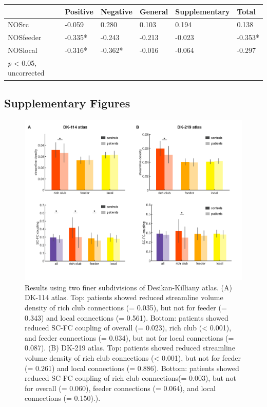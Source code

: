 \begin{refsection}
\bigskip

\scriptsize
\centering
{}
\label{tableS2:Corr} 
\begin{tabular}{llllll}\toprule
 &Positive&Negative&General&Supplementary&Total\\
 \midrule
NOSrc&-0.059&0.280&0.103&0.194&0.138\\
NOSfeeder&-0.335*&-0.243&-0.213&-0.023&-0.353*\\
NOSlocal&-0.316*&-0.362*&-0.016&-0.064&-0.297\\
\bottomrule
\scriptsize *  \textit{p} < 0.05, uncorrected
\end{tabular}

\bigskip

\newpage
\begin{flushleft}
\subsection*{Supplementary Figures}
\end{flushleft}

\begin{figure}[H]
\centering
  \includegraphics[width=\linewidth]{images/rcsczFigS1.png}
  \caption{\small Results using two finer subdivisions of Desikan-Killiany atlas. (A) DK-114 atlas. Top: patients showed reduced streamline volume density of rich club connections (\pval = 0.035), but not for feeder (\pval = 0.343) and local connections (\pval = 0.561). Bottom: patients showed reduced SC-FC coupling of overall (\pval = 0.023), rich club (\pval < 0.001), and feeder connections (\pval = 0.034), but not for local connections (\pval = 0.087). (B) DK-219 atlas. Top: patients showed reduced streamline volume density of rich club connections (\pval < 0.001), but not for feeder (\pval = 0.261) and local connections (\pval = 0.886). Bottom: patients showed reduced SC-FC coupling of rich club connections(\pval = 0.003), but not for overall (\pval = 0.060), feeder connections (\pval = 0.064), and local connections (\pval = 0.150).).
}
  \label{figureS1:dk114and250}
\end{figure}


\end{refsection}
